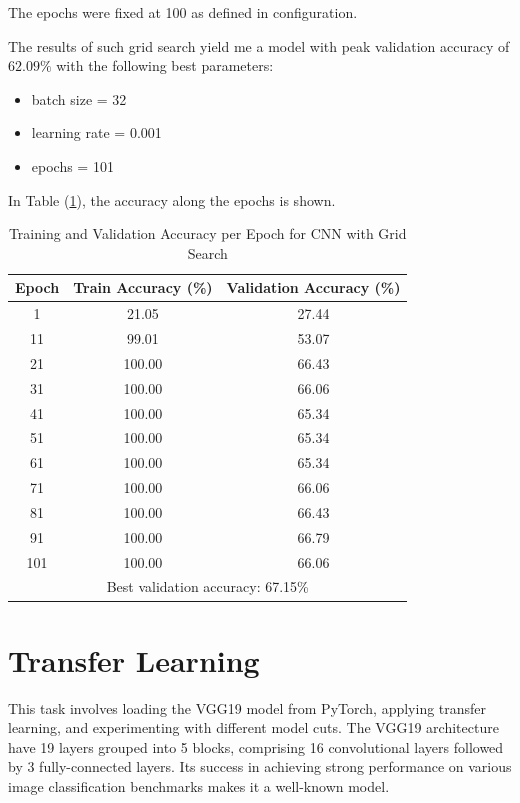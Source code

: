 \documentclass[11pt]{scrartcl}
\begin{document}
The epochs were fixed at 100 as defined in configuration.

The results of such grid search yield me a model with peak validation accuracy of
\( 62.09 \% \)
with the following best parameters:

\begin{itemize}
	\item batch size = 32
	\item learning rate = 0.001
	\item epochs = 101
\end{itemize}

In Table (\ref{tab:task2-bonus-accuracy}), the accuracy along the epochs is shown.

\begin{table}[htbp]
\centering
\caption{Training and Validation Accuracy per Epoch for CNN with Grid Search}
\begin{tabular}{ccc}
\toprule
\textbf{Epoch} & \textbf{Train Accuracy (\%)} & \textbf{Validation Accuracy (\%)} \\
\midrule
1    & 21.05 & 27.44 \\
11   & 99.01 & 53.07 \\
21   & 100.00 & 66.43 \\
31   & 100.00 & 66.06 \\
41   & 100.00 & 65.34 \\
51   & 100.00 & 65.34 \\
61   & 100.00 & 65.34 \\
71   & 100.00 & 66.06 \\
81   & 100.00 & 66.43 \\
91   & 100.00 & 66.79 \\
101  & 100.00 & 66.06 \\
\midrule
\multicolumn{3}{c}{Best validation accuracy: 67.15\%} \\
\bottomrule
\end{tabular}
\label{tab:task2-bonus-accuracy}
\end{table}


\newpage
\section{Transfer Learning}

This task involves loading the VGG19 model from PyTorch, 
applying transfer learning, and experimenting with different model cuts. 
The VGG19 architecture have 19 layers grouped into 5 blocks, 
comprising 16 convolutional layers followed by 3 fully-connected layers. 
Its success in achieving strong performance on various image classification benchmarks 
makes it a well-known model.
\end{document}
